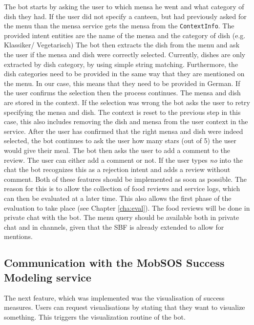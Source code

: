 The bot starts by asking the user to which mensa he went and what category of dish they had. If the user did not specify a canteen, but had previously asked for the menu than the mensa service gets the mensa from the \texttt{ContextInfo}. 
The provided intent entities are the name of the mensa and the category of dish (e.g. Klassiker/ Vegetarisch) 
The bot then extracts the dish from the menu and ask the user if the mensa and dish were correctly selected. Currently, dishes are only extracted by dish category, by using simple string matching. Furthermore, the dish categories need to be provided in the same way that they are mentioned on the menu. In our case, this means that they need to be provided in German.
If the user confirms the selection then the process continues. The mensa and dish are stored in the context. If the selection was wrong the bot asks the user to retry specifying the mensa and dish. The context is reset to the previous step in this case, this also includes removing the dish and mensa from the user context in the service.
After the user has confirmed that the right mensa and dish were indeed selected, the bot continues to ask the user how many stars (out of 5) the user would give their meal. 
The bot then asks the user to add a comment to the review. The user can either add a comment or not. If the user types \emph{no} into the chat the bot recognizes this as a rejection intent and adds a review without comment.
Both of these features should be implemented as soon as possible. The reason for this is to allow the collection of food reviews and service logs, which can then be evaluated at a later time.
This also allows the first phase of the evaluation to take place (see Chapter \ref{cha:eval}).
The food reviews will be done in private chat with the bot. The menu query should be available both in private chat and in channels, given that the SBF is already extended to allow for mentions.

\subsection{Communication with the MobSOS Success Modeling service}

The next feature, which was implemented was the visualisation of success measures. Users can request visualisations by stating that they want to visualize something.
This triggers the visualization routine of the bot.

